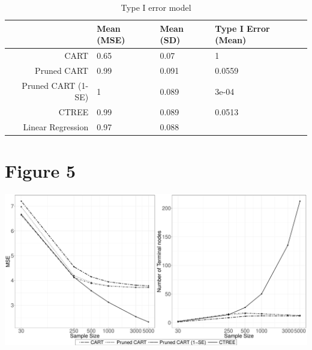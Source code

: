 \documentclass{article}
\begin{document}
\begin{table}[ht]
\centering
\begin{tabular}{rlll}
  \hline
 & Mean (MSE) & Mean (SD) & Type I Error (Mean) \\ 
  \hline
CART & 0.65 & 0.07 & 1 \\ 
  Pruned CART & 0.99 & 0.091 & 0.0559 \\ 
  Pruned CART (1-SE) & 1 & 0.089 & 3e-04 \\ 
  CTREE & 0.99 & 0.089 & 0.0513 \\ 
  Linear Regression & 0.97 & 0.088 &  \\ 
   \hline
\end{tabular}
\caption{Type I error model} 
\end{table}

\section*{Figure 5}
\includegraphics{code_for_tables-010}
\end{document}
